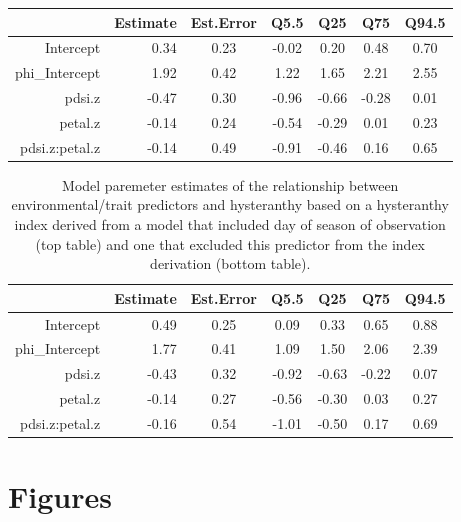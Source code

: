 \documentclass{article}[11pt]
\begin{document}
\begin{table}[ht]
\centering
\begin{tabular}{rrccccc}
  \hline
 & Estimate & Est.Error & Q5.5 & Q25 & Q75 & Q94.5 \\ 
  \hline
Intercept & 0.34 & 0.23 & -0.02 & 0.20 & 0.48 & 0.70 \\ 
  phi\_Intercept & 1.92 & 0.42 & 1.22 & 1.65 & 2.21 & 2.55 \\ 
  pdsi.z & -0.47 & 0.30 & -0.96 & -0.66 & -0.28 & 0.01 \\ 
  petal.z & -0.14 & 0.24 & -0.54 & -0.29 & 0.01 & 0.23 \\ 
  pdsi.z:petal.z & -0.14 & 0.49 & -0.91 & -0.46 & 0.16 & 0.65 \\ 
   \hline
\end{tabular}
\end{table}
\begin{table}
\centering
\begin{tabular}{rrccccc}
  \hline
 & Estimate & Est.Error & Q5.5 & Q25 & Q75 & Q94.5 \\ 
  \hline
Intercept & 0.49 & 0.25 & 0.09 & 0.33 & 0.65 & 0.88 \\ 
  phi\_Intercept & 1.77 & 0.41 & 1.09 & 1.50 & 2.06 & 2.39 \\ 
  pdsi.z & -0.43 & 0.32 & -0.92 & -0.63 & -0.22 & 0.07 \\ 
  petal.z & -0.14 & 0.27 & -0.56 & -0.30 & 0.03 & 0.27 \\ 
  pdsi.z:petal.z & -0.16 & 0.54 & -1.01 & -0.50 & 0.17 & 0.69 \\ 
   \hline
\end{tabular}
\caption{Model paremeter estimates of the relationship between environmental/trait predictors and hysteranthy based on a hysteranthy index derived from a model that included day of season of observation (top table) and one that excluded this predictor from the index derivation (bottom table).}
\label{tab:nodoy}
\end{table}

\pagebreak[4]

\section*{Figures} 
\end{document}
